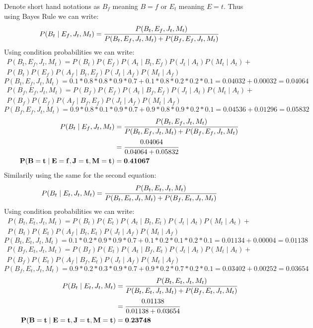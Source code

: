 \documentclass[a4paper]{article}
\theoremstyle{definition}
\newenvironment{soln}{
	\leavevmode\color{blue}\ignorespaces
}{}
\begin{document}
\begin{soln}
    Denote short hand notations as $B_f$ meaning $B=f$ or $E_t$ meaning $E=t$.
    Thus using Bayes Rule we can write:
    $$
        P(B_t \mid E_f, J_t, M_t) = \cfrac{P(B_t,E_f,J_t,M_t)}{P(B_t,E_f,J_t,M_t)+P(B_f,E_f,J_t,M_t)}
    $$
    Using condition probabilities we can write:
    \begin{multline*}
        P(B_t,E_f,J_t,M_t)=P(B_t)P(E_f)P(A_t\mid B_t,E_f)P(J_t\mid A_t)P(M_t\mid A_t) + \\ P(B_t)P(E_f)P(A_f\mid B_t,E_f)P(J_t\mid A_f)P(M_t\mid A_f)
    \end{multline*}
    $$P(B_t,E_f,J_t,M_t) = 0.1*0.8*0.8*0.9*0.7 + 0.1*0.8*0.2*0.2*0.1 = 0.04032 + 0.00032 = 0.04064$$
    \begin{multline*}
        P(B_f,E_f,J_t,M_t)=P(B_f)P(E_f)P(A_t\mid B_f,E_f)P(J_t\mid A_t)P(M_t\mid A_t) + \\ P(B_f)P(E_f)P(A_f\mid B_f,E_f)P(J_t\mid A_f)P(M_t\mid A_f)
    \end{multline*}
    $$P(B_f,E_f,J_t,M_t) = 0.9*0.8*0.1*0.9*0.7 + 0.9*0.8*0.9*0.2*0.1 =0.04536+0.01296= 0.05832$$
    \begin{align*}
        P(B_t \mid E_f, J_t, M_t) &= \cfrac{P(B_t,E_f,J_t,M_t)}{P(B_t,E_f,J_t,M_t)+P(B_f,E_f,J_t,M_t)} \\
        &= \cfrac{0.04064}{0.04064+0.05832} \\
        \mathbf{P(B=t \mid E=f, J=t, M=t)} &= \mathbf{0.41067}
    \end{align*}
    Similarily using the same for the second equation:
    $$
        P(B_t \mid E_t, J_t, M_t) = \cfrac{P(B_t,E_t,J_t,M_t)}{P(B_t,E_t,J_t,M_t)+P(B_f,E_t,J_t,M_t)}
    $$
    Using condition probabilities we can write:
    \begin{multline*}
        P(B_t,E_t,J_t,M_t)=P(B_t)P(E_t)P(A_t\mid B_t,E_t)P(J_t\mid A_t)P(M_t\mid A_t) + \\ P(B_t)P(E_t)P(A_f\mid B_t,E_t)P(J_t\mid A_f)P(M_t\mid A_f)
    \end{multline*}
    $$P(B_t,E_t,J_t,M_t) = 0.1*0.2*0.9*0.9*0.7 + 0.1*0.2*0.1*0.2*0.1 = 0.01134 + 0.00004 = 0.01138$$
    \begin{multline*}
        P(B_f,E_t,J_t,M_t)=P(B_f)P(E_t)P(A_t\mid B_f,E_t)P(J_t\mid A_t)P(M_t\mid A_t) + \\ P(B_f)P(E_t)P(A_f\mid B_f,E_t)P(J_t\mid A_f)P(M_t\mid A_f)
    \end{multline*}
    $$P(B_f,E_t,J_t,M_t) = 0.9*0.2*0.3*0.9*0.7 + 0.9*0.2*0.7*0.2*0.1 =0.03402+0.00252= 0.03654$$
    \begin{align*}
        P(B_t \mid E_t, J_t, M_t) &= \cfrac{P(B_t,E_t,J_t,M_t)}{P(B_t,E_t,J_t,M_t)+P(B_f,E_t,J_t,M_t)} \\
        &= \cfrac{0.01138}{0.01138+0.03654} \\
        \mathbf{P(B=t \mid E=t, J=t, M=t)} &= \mathbf{0.23748}
    \end{align*}
\end{soln}
\end{document}
